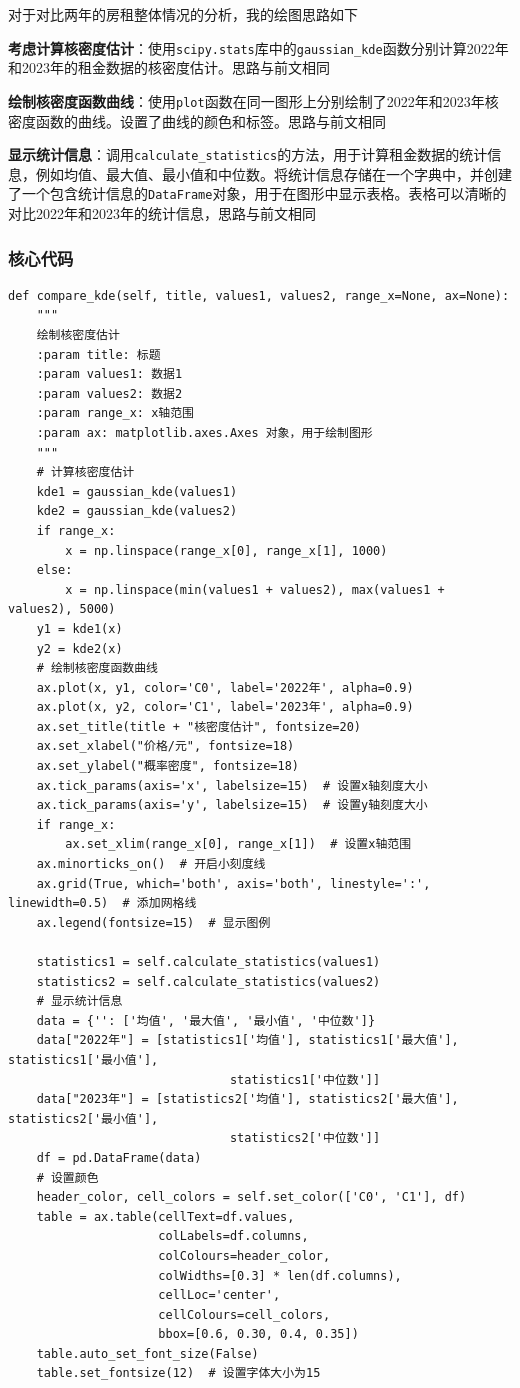 \documentclass[lang=cn,11pt,a4paper]{elegantpaper}
\begin{document}
对于对比两年的房租整体情况的分析，我的绘图思路如下

\textbf{考虑计算核密度估计}：使用\lstinline{scipy.stats}库中的\lstinline{gaussian_kde}函数分别计算2022年和2023年的租金数据的核密度估计。思路与前文相同

\textbf{绘制核密度函数曲线}：使用\lstinline{plot}函数在同一图形上分别绘制了2022年和2023年核密度函数的曲线。设置了曲线的颜色和标签。思路与前文相同

\textbf{显示统计信息}：调用\lstinline{calculate_statistics}的方法，用于计算租金数据的统计信息，例如均值、最大值、最小值和中位数。将统计信息存储在一个字典中，并创建了一个包含统计信息的\lstinline{DataFrame}对象，用于在图形中显示表格。表格可以清晰的对比2022年和2023年的统计信息，思路与前文相同

\subsubsection{核心代码}
\begin{lstlisting}
def compare_kde(self, title, values1, values2, range_x=None, ax=None):
    """
    绘制核密度估计
    :param title: 标题
    :param values1: 数据1
    :param values2: 数据2
    :param range_x: x轴范围
    :param ax: matplotlib.axes.Axes 对象，用于绘制图形
    """
    # 计算核密度估计
    kde1 = gaussian_kde(values1)
    kde2 = gaussian_kde(values2)
    if range_x:
        x = np.linspace(range_x[0], range_x[1], 1000)
    else:
        x = np.linspace(min(values1 + values2), max(values1 + values2), 5000)
    y1 = kde1(x)
    y2 = kde2(x)
    # 绘制核密度函数曲线
    ax.plot(x, y1, color='C0', label='2022年', alpha=0.9)
    ax.plot(x, y2, color='C1', label='2023年', alpha=0.9)
    ax.set_title(title + "核密度估计", fontsize=20)
    ax.set_xlabel("价格/元", fontsize=18)
    ax.set_ylabel("概率密度", fontsize=18)
    ax.tick_params(axis='x', labelsize=15)  # 设置x轴刻度大小
    ax.tick_params(axis='y', labelsize=15)  # 设置y轴刻度大小
    if range_x:
        ax.set_xlim(range_x[0], range_x[1])  # 设置x轴范围
    ax.minorticks_on()  # 开启小刻度线
    ax.grid(True, which='both', axis='both', linestyle=':', linewidth=0.5)  # 添加网格线
    ax.legend(fontsize=15)  # 显示图例

    statistics1 = self.calculate_statistics(values1)
    statistics2 = self.calculate_statistics(values2)
    # 显示统计信息
    data = {'': ['均值', '最大值', '最小值', '中位数']}
    data["2022年"] = [statistics1['均值'], statistics1['最大值'], statistics1['最小值'],
                               statistics1['中位数']]
    data["2023年"] = [statistics2['均值'], statistics2['最大值'], statistics2['最小值'],
                               statistics2['中位数']]
    df = pd.DataFrame(data)
    # 设置颜色
    header_color, cell_colors = self.set_color(['C0', 'C1'], df)
    table = ax.table(cellText=df.values,
                     colLabels=df.columns,
                     colColours=header_color,
                     colWidths=[0.3] * len(df.columns),
                     cellLoc='center',
                     cellColours=cell_colors,
                     bbox=[0.6, 0.30, 0.4, 0.35])
    table.auto_set_font_size(False)
    table.set_fontsize(12)  # 设置字体大小为15
\end{lstlisting}
\end{document}
